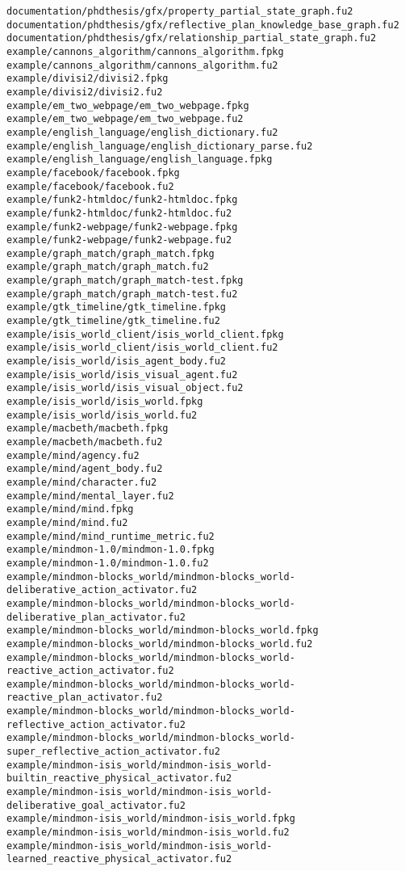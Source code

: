 \begin{lstlisting}
documentation/phdthesis/gfx/property_partial_state_graph.fu2
documentation/phdthesis/gfx/reflective_plan_knowledge_base_graph.fu2
documentation/phdthesis/gfx/relationship_partial_state_graph.fu2
example/cannons_algorithm/cannons_algorithm.fpkg
example/cannons_algorithm/cannons_algorithm.fu2
example/divisi2/divisi2.fpkg
example/divisi2/divisi2.fu2
example/em_two_webpage/em_two_webpage.fpkg
example/em_two_webpage/em_two_webpage.fu2
example/english_language/english_dictionary.fu2
example/english_language/english_dictionary_parse.fu2
example/english_language/english_language.fpkg
example/facebook/facebook.fpkg
example/facebook/facebook.fu2
example/funk2-htmldoc/funk2-htmldoc.fpkg
example/funk2-htmldoc/funk2-htmldoc.fu2
example/funk2-webpage/funk2-webpage.fpkg
example/funk2-webpage/funk2-webpage.fu2
example/graph_match/graph_match.fpkg
example/graph_match/graph_match.fu2
example/graph_match/graph_match-test.fpkg
example/graph_match/graph_match-test.fu2
example/gtk_timeline/gtk_timeline.fpkg
example/gtk_timeline/gtk_timeline.fu2
example/isis_world_client/isis_world_client.fpkg
example/isis_world_client/isis_world_client.fu2
example/isis_world/isis_agent_body.fu2
example/isis_world/isis_visual_agent.fu2
example/isis_world/isis_visual_object.fu2
example/isis_world/isis_world.fpkg
example/isis_world/isis_world.fu2
example/macbeth/macbeth.fpkg
example/macbeth/macbeth.fu2
example/mind/agency.fu2
example/mind/agent_body.fu2
example/mind/character.fu2
example/mind/mental_layer.fu2
example/mind/mind.fpkg
example/mind/mind.fu2
example/mind/mind_runtime_metric.fu2
example/mindmon-1.0/mindmon-1.0.fpkg
example/mindmon-1.0/mindmon-1.0.fu2
example/mindmon-blocks_world/mindmon-blocks_world-deliberative_action_activator.fu2
example/mindmon-blocks_world/mindmon-blocks_world-deliberative_plan_activator.fu2
example/mindmon-blocks_world/mindmon-blocks_world.fpkg
example/mindmon-blocks_world/mindmon-blocks_world.fu2
example/mindmon-blocks_world/mindmon-blocks_world-reactive_action_activator.fu2
example/mindmon-blocks_world/mindmon-blocks_world-reactive_plan_activator.fu2
example/mindmon-blocks_world/mindmon-blocks_world-reflective_action_activator.fu2
example/mindmon-blocks_world/mindmon-blocks_world-super_reflective_action_activator.fu2
example/mindmon-isis_world/mindmon-isis_world-builtin_reactive_physical_activator.fu2
example/mindmon-isis_world/mindmon-isis_world-deliberative_goal_activator.fu2
example/mindmon-isis_world/mindmon-isis_world.fpkg
example/mindmon-isis_world/mindmon-isis_world.fu2
example/mindmon-isis_world/mindmon-isis_world-learned_reactive_physical_activator.fu2

\end{lstlisting}
